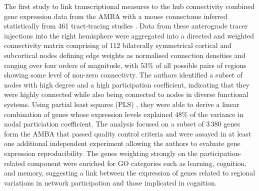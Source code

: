 The first study to link transcriptional measures to the hub connectivity \citep{Rubinov2015c} combined gene expression data from the AMBA \citep{Lein2007a} with a mouse connectome inferred statistically from 461 tract-tracing studies \citep{Oh2014}. 
Data from these anterograde tracer injections into the right hemisphere were aggregated into a directed and weighted connectivity matrix comprising of 112 bilaterally symmetrical cortical and subcortical nodes defining edge weights as normalised connection densities and ranging over four orders of magnitude, with $53$\% of all possible pairs of regions showing some level of non-zero connectivty. 
The authors identified a subset of nodes with high degree and a high participation coefficient, indicating that they were highly connected while also being connected to nodes in diverse functional systems. 
Using partial least squares (PLS) \citep{Herve2010}, they were able to derive a linear combination of genes whose expression levels explained $48$\% of the variance in nodal particiation coefficient. The analysis focused on a subset of 3\,380 genes form the AMBA that passed quality control criteria and were assayed in at least one additional independent experiment allowing the authors to evaluate gene expression reproducibility. The genes weighting strongly on the participation-related component were enriched for GO categories such as learning, cognition, and memory, suggesting a link between the expression of genes related to regional variations in network participation and those implicated in cognition. 

